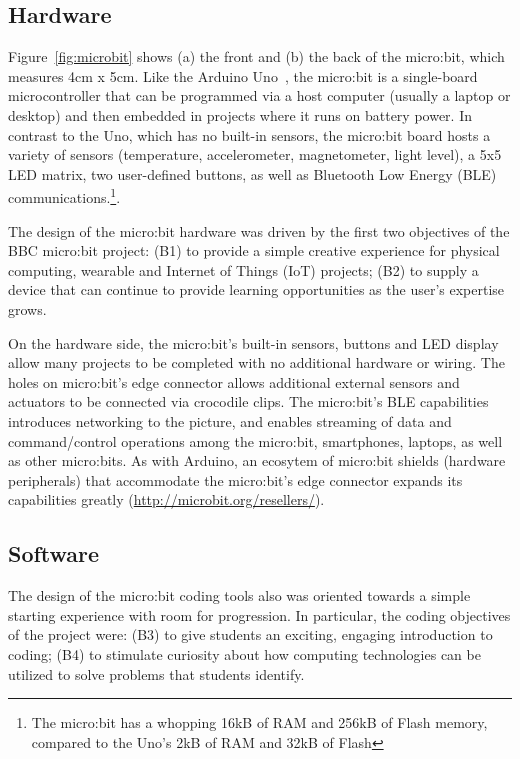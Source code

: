 \subsection{Hardware}

Figure~\ref{fig:microbit} shows (a) the front and (b) the back of the
micro:bit, which measures 4cm x 5cm. Like the Arduino Uno~\cite{Arduino},
the micro:bit is a single-board microcontroller
that can be programmed via a host computer (usually a laptop or desktop)
and then embedded in projects where it runs on battery power.
In contrast to the Uno, which has no built-in sensors, the micro:bit
board hosts a variety of sensors (temperature, accelerometer, magnetometer,
light level),
a 5x5 LED matrix, two user-defined buttons, as well as Bluetooth
Low Energy (BLE) communications.\footnote{The micro:bit has a whopping
16kB of RAM and 256kB of Flash memory, compared to the Uno's 2kB of
RAM and 32kB of Flash}.

The design of the micro:bit hardware was driven by the
first two objectives of the BBC micro:bit project:
(B1) to provide a simple creative experience for physical computing, wearable and Internet of Things (IoT) projects;
(B2) to supply a device that can continue to provide learning opportunities as the user's expertise grows.

On the hardware side, the micro:bit's built-in sensors, buttons and LED display
allow many projects to be completed with no additional hardware or wiring.
The holes on micro:bit's edge
connector allows additional external sensors and actuators to be connected via crocodile clips.
The micro:bit's BLE capabilities introduces networking to the
picture, and enables streaming of data and command/control operations among the micro:bit,
smartphones, laptops, as well as other micro:bits.
As with Arduino, an ecosytem of micro:bit shields
(hardware peripherals) that accommodate the micro:bit's edge
connector expands its capabilities greatly (\url{http://microbit.org/resellers/}).

\subsection{Software}

The design of the micro:bit coding tools also was oriented towards a
simple starting experience with room for progression. In particular, the coding
objectives of the project were: (B3)
to give students an exciting, engaging introduction to coding;
(B4) to stimulate curiosity about how computing technologies can be utilized
  to solve problems that students identify.

